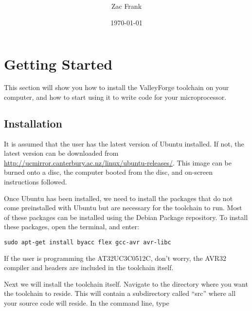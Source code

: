 \documentclass[a4paper, oneside, 11pt, titlepage, onecolumn, openright]{article}
\title{\projecttitle \\ \documenttitle}
\author{Zac Frank}
\date{\today}
\begin{document}
	\maketitle
	
	\clearpage
	\tableofcontents



	\clearpage

\section{Getting Started}
			\label{s:Getting Started}

			This section will show you how to install the ValleyForge toolchain on your computer, and how to start using it to write code for your microprocessor.

	\subsection{Installation }
			\label{ss:Installation}

			It is assumed that the user has the latest version of Ubuntu installed. If not, the latest version can be downloaded from \url{http://ucmirror.canterbury.ac.nz/linux/ubuntu-releases/}. This image can be burned onto a disc, the computer booted from the disc, and on-screen instructions followed.
			
			Once Ubuntu has been installed, we need to install the packages that do not come preinstalled with Ubuntu but are necessary for the toolchain to run. Most of these packages can be installed using the Debian Package repository. To install these packages, open the terminal, and enter:
			
\begin{lstlisting}
sudo apt-get install byacc flex gcc-avr avr-libc
\end{lstlisting}

			If the user is programming the AT32UC3C0512C, don't worry, the AVR32 compiler and headers are included in the toolchain itself.

			Next we will install the toolchain itself. Navigate to the directory where you want the toolchain to reside. This will contain a subdirectory called ``src'' where all your source code will reside.
In the command line, type \newline
\end{document}
